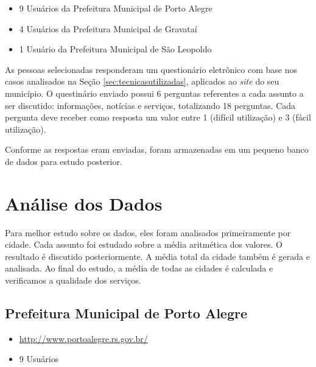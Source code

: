\documentclass{article}
\begin{document}
\begin{itemize}
  \item 9 Usuários da Prefeitura Municipal de Porto Alegre
  \item 4 Usuários da Prefeitura Municipal de Gravataí
  \item 1 Usuário da Prefeitura Municipal de São Leopoldo
\end{itemize}

As pessoas selecionadas responderam um questionário eletrônico
\cite{camargo2010a} com base nos casos analisados na Seção
\ref{sec:tecnicasutilizadas}, aplicados ao \textit{site} do seu município. O
questinário enviado possui 6 perguntas referentes a cada assunto a ser
discutido: informações, notícias e serviços, totalizando 18 perguntas. Cada
pergunta deve receber como resposta um valor entre 1 (difícil utilização) e 3
(fácil utilização).

Conforme as respostas eram enviadas, foram armazenadas em um pequeno banco de
dados para estudo posterior.

\section{Análise dos Dados}
\label{sec:analise}

Para melhor estudo sobre os dados, eles foram analisados primeiramente por
cidade. Cada assunto foi estudado sobre a média aritmética dos valores. O
resultado é discutido posteriormente. A média total da cidade também é gerada e
analisada. Ao final do estudo, a média de todas as cidades é calculada e
verificamos a qualidade dos serviços.

\subsection{Prefeitura Municipal de Porto Alegre}

\begin{itemize}
  \item \url{http://www.portoalegre.rs.gov.br/}
  \item 9 Usuários
\end{itemize}
\end{document}

